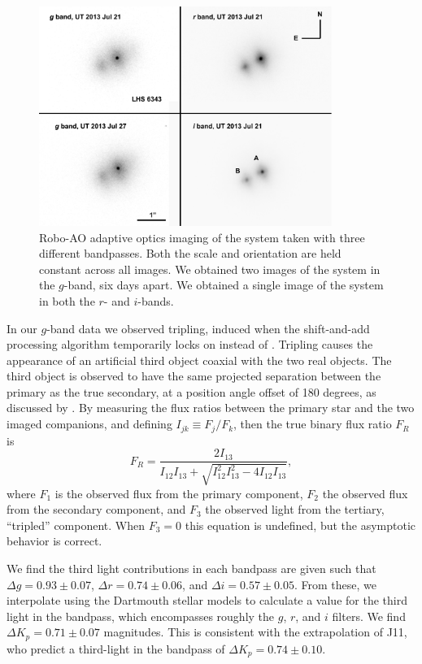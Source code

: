 \begin{figure}[htbp!]
\centerline{\includegraphics[width=0.85\textwidth]{chapter4/f1.pdf}}
\caption[Robo-AO adaptive optics imaging of the \LHS{} system]{Robo-AO adaptive optics imaging of the \LHS{} system taken with three different bandpasses.
Both the scale and orientation are held constant across all images.
We obtained two images of the system in the $g$-band, six days apart.
We obtained a single image of the system in both the $r$- and $i$-bands.
  }
\label{AOPlot}
\end{figure}


In our $g$-band data we observed tripling, induced when the shift-and-add processing algorithm temporarily locks on \LB{} instead of \LA.
Tripling causes the appearance of an artificial third object coaxial with the two real objects.
The third object is observed to have the same projected separation between the primary as the true secondary, at a position angle offset of 180 degrees, as discussed by \citet{Law06b}.
By measuring the flux ratios between the primary star and the two imaged companions, and defining $I_{jk} \equiv F_j/F_k$, then the true binary flux ratio $F_R$ is
\begin{equation}
F_R = \frac{2 I_{13}}{I_{12}I_{13} + \sqrt{I_{12}^2 I_{13}^2 - 4 I_{12} I_{13}}},
\end{equation}
where $F_1$ is the observed flux from the primary component, $F_2$ the observed flux from the secondary component, and $F_3$ the observed light from the tertiary, ``tripled'' component.
When $F_3 = 0$ this equation is undefined, but the asymptotic behavior is correct.

We find the third light contributions in each bandpass are given such that $\Delta g = 0.93 \pm 0.07$, $\Delta r = 0.74 \pm 0.06$, and $\Delta i = 0.57 \pm 0.05$.  
From these, we interpolate using the Dartmouth stellar models to calculate a value for the third light in the \itk{} bandpass, which encompasses roughly the $g$, $r$, and $i$ filters.
We find $\Delta K_p = 0.71 \pm 0.07$ magnitudes.
This is consistent with the extrapolation of J11, who predict a third-light in the \itk{} bandpass of $\Delta K_p = 0.74 \pm 0.10$. 


